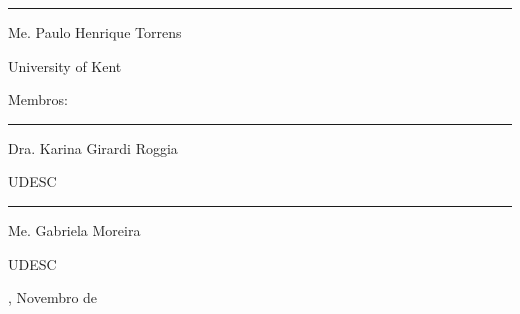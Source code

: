 \begin{folhadeaprovacao}
	\begin{center}
		\begin{minipage}{8.75cm}
			\begin{flushleft}
				\rule{8.75cm}{0.1mm}

				Me. Paulo Henrique Torrens \par
				University of Kent
			\end{flushleft}
		\end{minipage}
	\end{center}

	\vspace*{\baselineskip}
	{Membros:}

	\begin{center}
		\begin{minipage}{8.75cm}
			\begin{flushleft}
				\rule{8.75cm}{0.1mm}

				Dra. Karina Girardi Roggia \par
				UDESC

				\vspace*{1cm}
				\rule{8.75cm}{0.1mm}

				Me. Gabriela Moreira \par
				UDESC
			\end{flushleft}
		\end{minipage}
	\end{center}

	\vspace*{\fill}
	\begin{center}
		{\imprimirlocal, Novembro de \imprimirdata}
	\end{center}
	\vspace*{0.25cm}
\end{folhadeaprovacao}




